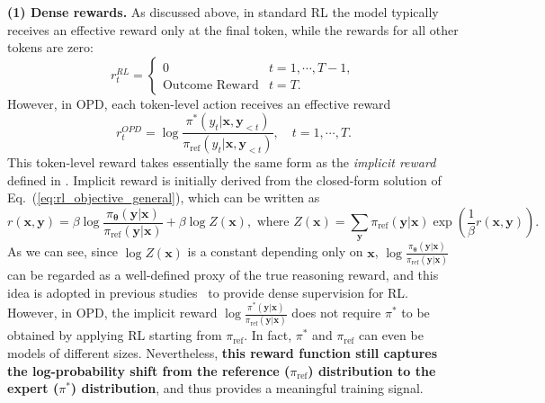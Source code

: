 \documentclass{article} %
\begin{document}
\textbf{(1) Dense rewards.} As discussed above, in standard RL the model typically receives an effective reward only at the final token, while the rewards for all other tokens are zero:
\begin{equation}
\label{eq:rewards_in_rl}
r_{t}^{RL}= \begin{cases}
0 & t=1,\cdots,T-1 , \\
\text{Outcome Reward} & t=T .
\end{cases}
\end{equation}
However, in OPD, each token-level action receives an effective reward 
\begin{equation}
\label{eq:rewards_in_opd}
r_{t}^{OPD}= \log \frac{\pi^{*}(y_t | \boldsymbol{x}, \boldsymbol{y}_{<t})}{\pi_{\mathrm{ref}}(y_t | \boldsymbol{x}, \boldsymbol{y}_{<t})}, \quad t=1,\cdots, T.
\end{equation}
This token-level reward takes essentially the same form as the \textit{implicit reward} defined in \citet{dpo}. Implicit reward is initially derived from the closed-form solution of Eq.~(\ref{eq:rl_objective_general}), which can be written as
\begin{equation}
\label{eq:rl_solution}
r(\boldsymbol{x},\boldsymbol{y})=\beta \log \frac{\pi_{\boldsymbol{\theta}}(\boldsymbol{y}|\boldsymbol{x})}{ \pi_{\mathrm{ref}}(\boldsymbol{y}|\boldsymbol{x})} + \beta \log Z(\boldsymbol{x}),\text{ where } Z(\boldsymbol{x})=\sum_{\boldsymbol{y}} \pi_{\text{ref}}(\boldsymbol{y}|\boldsymbol{x}) \exp (\frac{1}{\beta}r(\boldsymbol{x},\boldsymbol{y})).
\end{equation}
As we can see, since $\log Z(\boldsymbol{x})$ is a constant depending only on $\boldsymbol{x}$,  $\log \frac{\pi_{\boldsymbol{\theta}}(\boldsymbol{y}|\boldsymbol{x})}{ \pi_{\mathrm{ref}}(\boldsymbol{y}|\boldsymbol{x})}$ can be regarded as a well-defined proxy of the true reasoning reward, and this idea is adopted in previous studies~\citep{implicitprm,prime,laser,agentic_implicit_reward} to provide dense supervision for RL. However, in OPD, the implicit reward
$\log \frac{\pi^{*}(\boldsymbol{y} | \boldsymbol{x} )}{\pi_{\mathrm{ref}}(\boldsymbol{y} | \boldsymbol{x})}$
does not require $\pi^{*}$ to be obtained by applying RL starting from $\pi_{\mathrm{ref}}$. In fact, $\pi^{*}$ and $\pi_{\mathrm{ref}}$ can even be models of different sizes. Nevertheless, \textbf{this reward function still captures the log-probability shift from the reference ($\pi_{\mathrm{ref}}$) distribution to the expert ($\pi^{*}$) distribution}, and thus provides a meaningful training signal.
\end{document}
